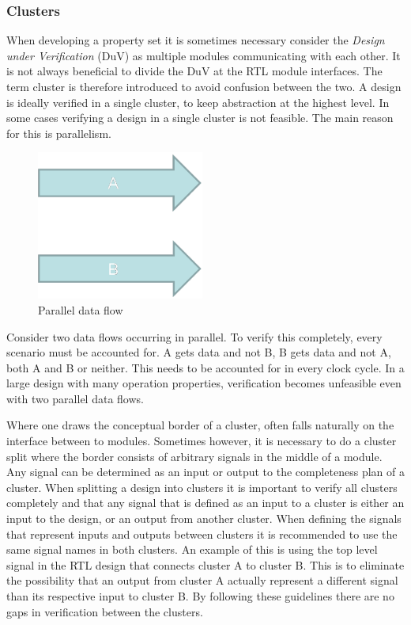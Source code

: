 \subsubsection{Clusters}
\label{sub:clust}
When developing a property set it is sometimes necessary consider the \textit{Design under Verification} (DuV) as multiple modules communicating with each other. It is not always beneficial to divide the DuV at the RTL module interfaces. The term cluster is therefore introduced to avoid confusion between the two. A design is ideally verified in a single cluster, to keep abstraction at the highest level. In some cases verifying a design in a single cluster is not feasible. The main reason for this is parallelism.\\ 
\begin{figure}
\includegraphics[width=5.5cm]{figs/Verif/parallell.png}
\caption{Parallel data flow}\label{fig:para}
\end{figure} 

Consider two data flows occurring in parallel. To verify this completely, every scenario must be accounted for. A gets data and not B, B gets data and not A, both A and B or neither. This needs to be accounted for in every clock cycle. In a large design with many operation properties, verification becomes unfeasible even with two parallel data flows.     


Where one draws the conceptual border of a cluster, often falls naturally on the interface between to modules. Sometimes however, it is necessary to do a cluster split where the border consists of arbitrary signals in the middle of a module. Any signal can be determined as an input or output to the completeness plan of a cluster\cite{clust}. When splitting a design into clusters it is important to verify all clusters completely and that any signal that is defined as an input to a cluster is either an input to the design, or an output from another cluster. When defining the signals that represent inputs and outputs between clusters it is recommended to use the same signal names in both clusters. An example of this is using the top level signal in the RTL design that connects cluster A to cluster B. This is to eliminate the possibility that an output from cluster A actually represent a different signal than its respective input to cluster B. By following these guidelines there are no gaps in verification between the clusters. 



